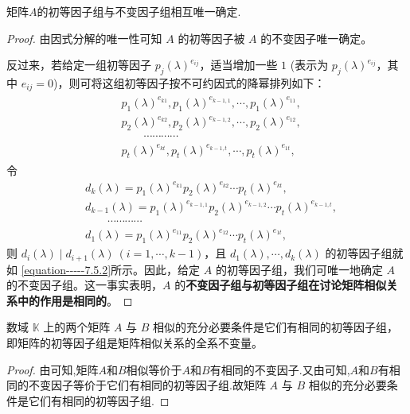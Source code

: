 \documentclass[../../main.tex]{subfiles}
\begin{document}
\begin{proposition}\label{proposition:初等因子组与不变因子组相互唯一确定}
矩阵$A$的初等因子组与不变因子组相互唯一确定.
\end{proposition}
\begin{proof}
由因式分解的唯一性可知 $A$ 的初等因子被 $A$ 的不变因子唯一确定。

反过来，若给定一组初等因子 $p_j(\lambda)^{e_{ij}}$，适当增加一些 $1$ (表示为 $p_j(\lambda)^{e_{ij}}$，其中 $e_{ij}=0$)，则可将这组初等因子按不可约因式的降幂排列如下：
\begin{align}\label{equation-----7.5.2}
\begin{aligned}
&p_1(\lambda)^{e_{k1}},p_1(\lambda)^{e_{k - 1,1}},\cdots,p_1(\lambda)^{e_{11}},\\
&p_2(\lambda)^{e_{k2}},p_2(\lambda)^{e_{k - 1,2}},\cdots,p_2(\lambda)^{e_{12}},\\
&\quad \quad \cdots\cdots\cdots\cdots\\
&p_t(\lambda)^{e_{kt}},p_t(\lambda)^{e_{k - 1,t}},\cdots,p_t(\lambda)^{e_{1t}},
\end{aligned}
\end{align}
令
\begin{align*}
&d_k(\lambda)=p_1(\lambda)^{e_{k1}}p_2(\lambda)^{e_{k2}}\cdots p_t(\lambda)^{e_{kt}},\\
&d_{k - 1}(\lambda)=p_1(\lambda)^{e_{k - 1,1}}p_2(\lambda)^{e_{k - 1,2}}\cdots p_t(\lambda)^{e_{k - 1,t}},\\
&\quad \quad \cdots\cdots\cdots\cdots\\
&d_1(\lambda)=p_1(\lambda)^{e_{11}}p_2(\lambda)^{e_{12}}\cdots p_t(\lambda)^{e_{1t}},
\end{align*}
则 $d_i(\lambda)\mid d_{i + 1}(\lambda)\ (i = 1,\cdots,k - 1)$，且 $d_1(\lambda),\cdots,d_k(\lambda)$ 的初等因子组就如 \eqref{equation-----7.5.2}所示。因此，给定 $A$ 的初等因子组，我们可唯一地确定 $A$ 的不变因子组。这一事实表明，$A$ 的\textbf{不变因子组与初等因子组在讨论矩阵相似关系中的作用是相同的}。 

\end{proof}


\begin{theorem}\label{theorem:矩阵相似的充分必要条件是它们有相同的初等因子组}
数域 $\mathbb{K}$ 上的两个矩阵 $A$ 与 $B$ 相似的充分必要条件是它们有相同的初等因子组，即矩阵的初等因子组是矩阵相似关系的全系不变量。 
\end{theorem}
\begin{proof}
由可知,矩阵$A$和$B$相似等价于$A$和$B$有相同的不变因子.又由可知,$A$和$B$有相同的不变因子等价于它们有相同的初等因子组.故矩阵 $A$ 与 $B$ 相似的充分必要条件是它们有相同的初等因子组.

\end{proof}
\end{document}
